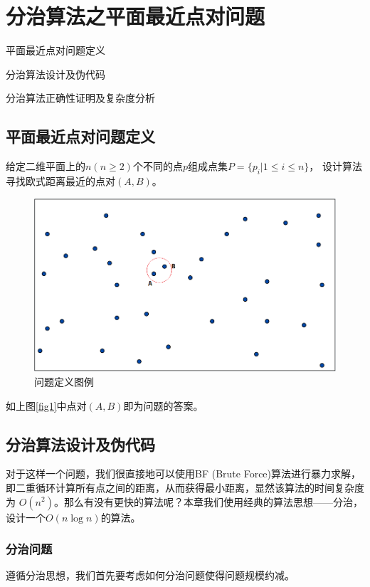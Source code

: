 \chapter{分治算法之平面最近点对问题}

\begin{introduction}
\item 平面最近点对问题定义
\item 分治算法设计及伪代码
\item 分治算法正确性证明及复杂度分析
\end{introduction}

\section{平面最近点对问题定义}
给定二维平面上的$n(n \ge 2)$个不同的点$p$组成点集$P = \{p_i \big| 1\le i \le n\}$，
设计算法寻找欧式距离最近的点对$(A,B)$。
\begin{figure}[htb]
    \centering
    \includegraphics[scale=0.5]{Ln9.image/NearestPointsDef.png}
    \caption{问题定义图例}\label{fig1}
\end{figure}

如上图\autoref{fig1}中点对$(A,B)$即为问题的答案。

\section{分治算法设计及伪代码}
对于这样一个问题，我们很直接地可以使用BF (Brute Force)算法进行暴力求解，
即二重循环计算所有点之间的距离，从而获得最小距离，显然该算法的时间复杂度为
$O(n^2)$。那么有没有更快的算法呢？本章我们使用经典的算法思想——分治，
设计一个$O(n\log n)$的算法。

\subsection{分治问题}
遵循分治思想，我们首先要考虑如何分治问题使得问题规模约减。

